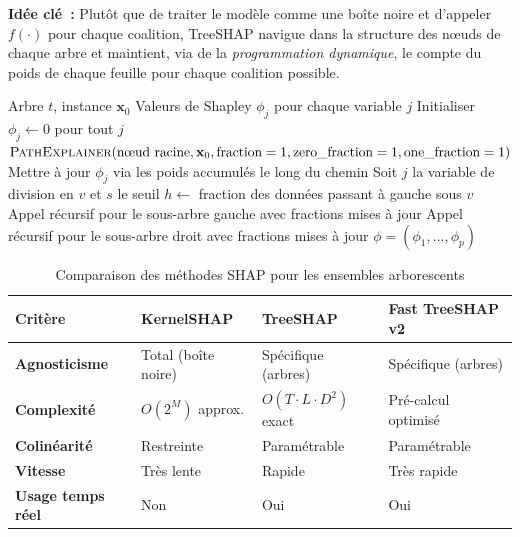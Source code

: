 \textbf{Idée clé~:} Plutôt que de traiter le modèle comme une boîte noire et d'appeler
$f(\cdot)$ pour chaque coalition, TreeSHAP navigue dans la structure des nœuds de chaque
arbre et maintient, via de la \textit{programmation dynamique}, le compte du poids de
chaque feuille pour chaque coalition possible.

\begin{algorithm}[H]
\caption{TreeSHAP — calcul exact pour un arbre unique $t$}
\begin{algorithmic}[1]
\Require Arbre $t$, instance $\mathbf{x}_0$
\Ensure Valeurs de Shapley $\phi_j$ pour chaque variable $j$
\State Initialiser $\phi_j \leftarrow 0$ pour tout $j$
\State $\textsc{PathExplainer}(\text{nœud racine}, \mathbf{x}_0, \text{fraction}=1, \text{zero\_fraction}=1, \text{one\_fraction}=1)$
      \State Mettre à jour $\phi_j$ via les poids accumulés le long du chemin
  \Else
      \State Soit $j$ la variable de division en $v$ et $s$ le seuil
      \State $h \leftarrow$ fraction des données passant à gauche sous $v$
      \State Appel récursif pour le sous-arbre gauche avec fractions mises à jour
      \State Appel récursif pour le sous-arbre droit avec fractions mises à jour
  \EndIf
\EndProcedure
\State \Return $\phi = (\phi_1, \ldots, \phi_p)$
\end{algorithmic}
\end{algorithm}

\begin{table}[H]
\centering
\caption{Comparaison des méthodes SHAP pour les ensembles arborescents}
\renewcommand{\arraystretch}{1.4}
\begin{tabular}{>{\bfseries}p{3.8cm} p{3cm} p{3cm} p{3.8cm}}
\toprule
Critère & KernelSHAP & TreeSHAP & Fast TreeSHAP v2 \\
\midrule
Agnosticisme & Total (boîte noire) & Spécifique (arbres) & Spécifique (arbres) \\
Complexité & $O(2^M)$ approx. & $O(T \cdot L \cdot D^2)$ exact & Pré-calcul optimisé \\
Colinéarité & Restreinte & Paramétrable & Paramétrable \\
Vitesse & Très lente & Rapide & Très rapide \\
Usage temps réel & Non & Oui & Oui \\
\bottomrule
\end{tabular}
\label{tab:comparaison_shap}
\end{table}

